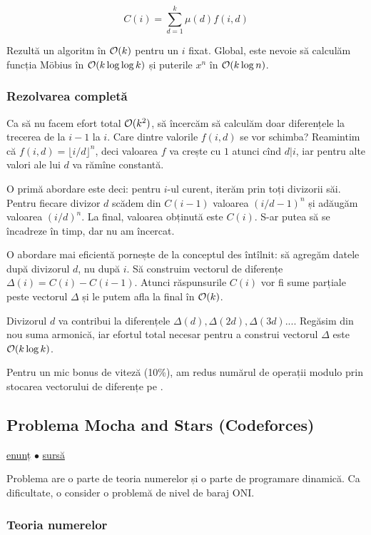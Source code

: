 \documentclass[../main.tex]{subfiles}
\begin{document}
$$C(i) = \sum_{d=1}^{k} \mu(d) f(i,d)$$

Rezultă un algoritm în $\mathcal{O}(k)$ pentru un $i$ fixat. Global, este nevoie să calculăm funcția Möbius în $\mathcal{O}(k \log \log k)$ și puterile $x^n$ în $\mathcal{O}(k \log n)$.

\subsubsection*{Rezolvarea completă}

Ca să nu facem efort total $\mathcal{O}(k^2)$, să încercăm să calculăm doar diferențele la trecerea de la $i-1$ la $i$. Care dintre valorile $f(i,d)$ se vor schimba? Reamintim că $f(i,d) = \lfloor i/d \rfloor^{n}$, deci valoarea $f$ va crește cu $1$ atunci cînd $d|i$, iar pentru alte valori ale lui $d$ va rămîne constantă.

O primă abordare este deci: pentru $i$-ul curent, iterăm prin toți divizorii săi. Pentru fiecare divizor $d$ scădem din $C(i-1)$ valoarea $(i/d -1)^{n}$ și adăugăm valoarea $(i/d)^{n}$. La final, valoarea obținută este $C(i)$. S-ar putea să se încadreze în timp, dar nu am încercat.

O abordare mai eficientă pornește de la conceptul des întîlnit: să agregăm datele după divizorul $d$, nu după $i$. Să construim vectorul de diferențe $\Delta(i) = C(i) - C(i-1)$. Atunci răspunsurile $C(i)$ vor fi sume parțiale peste vectorul $\Delta$ și le putem afla la final în $\mathcal{O}(k)$.

Divizorul $d$ va contribui la diferențele $\Delta(d), \Delta(2d), \Delta(3d)...$. Regăsim din nou suma armonică, iar efortul total necesar pentru a construi vectorul $\Delta$ este $\mathcal{O}(k \log k)$.

Pentru un mic bonus de viteză (10\%), am redus numărul de operații modulo prin stocarea vectorului de diferențe pe .


\subsection{Problema Mocha and Stars (Codeforces)}
\label{problem:mocha-and-stars}

\href{https://codeforces.com/contest/1559/problem/E}{enunț}
$\bullet$
\hyperref[code:mocha-and-stars]{sursă}

Problema are o parte de teoria numerelor și o parte de programare dinamică. Ca dificultate, o consider o problemă de nivel de baraj ONI.

\subsubsection*{Teoria numerelor}
\end{document}
